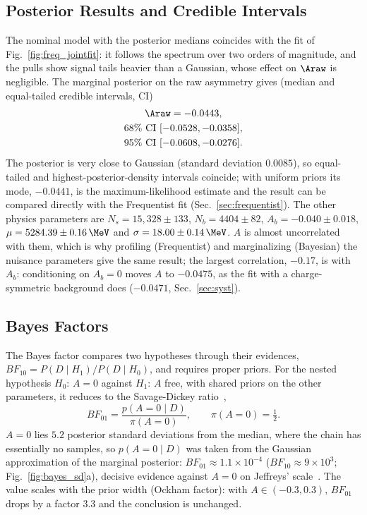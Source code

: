 \subsection{Posterior Results and Credible Intervals}
\label{sec:bayes_posterior}
The nominal model with the posterior medians coincides with the fit of Fig.~\ref{fig:freq_jointfit}: it follows the spectrum over two orders of magnitude, and the pulls show signal tails heavier than a Gaussian, whose effect on $\Araw$ is negligible. The marginal posterior on the raw asymmetry gives (median and equal-tailed credible intervals, CI)
\begin{gather*}
\Araw = -0.0443, \\
68\%~\text{CI}~[-0.0528,-0.0358], \\ 95\%~\text{CI}~[-0.0608,-0.0276].
\end{gather*}
The posterior is very close to Gaussian (standard deviation $0.0085$), so equal-tailed and highest-posterior-density intervals coincide; with uniform priors its mode, $-0.0441$, is the maximum-likelihood estimate and the result can be compared directly with the Frequentist fit (Sec.~\ref{sec:frequentist}). The other physics parameters are $N_s=15{,}328\pm133$, $N_b=4404\pm82$, $A_b=-0.040\pm0.018$, $\mu=5284.39\pm0.16\,\MeV$ and $\sigma=18.00\pm0.14\,\MeV$. $A$ is almost uncorrelated with them, which is why profiling (Frequentist) and marginalizing (Bayesian) the nuisance parameters give the same result; the largest correlation, $-0.17$, is with $A_b$: conditioning on $A_b=0$ moves $A$ to $-0.0475$, as the fit with a charge-symmetric background does ($-0.0471$, Sec.~\ref{sec:syst}).




\subsection{Bayes Factors}
\label{sec:bayes_factor}
The Bayes factor compares two hypotheses through their evidences, $BF_{10}=P(D\mid H_1)/P(D\mid H_0)$, and requires proper priors. For the nested hypothesis $H_0$: $A=0$ against $H_1$: $A$ free, with shared priors on the other parameters, it reduces to the Savage-Dickey ratio~\cite{dickey1971},
\[
BF_{01} = \frac{p(A=0\mid D)}{\pi(A=0)}, \qquad \pi(A=0)=\tfrac12 .
\]
$A=0$ lies $5.2$ posterior standard deviations from the median, where the chain has essentially no samples, so $p(A=0\mid D)$ was taken from the Gaussian approximation of the marginal posterior: $BF_{01}\approx1.1\times10^{-4}$ ($BF_{10}\approx9\times10^{3}$; Fig.~\ref{fig:bayes_sd}a), decisive evidence against $A=0$ on Jeffreys' scale~\cite{jeffreys}. The value scales with the prior width (Ockham factor): with $A\in(-0.3,0.3)$, $BF_{01}$ drops by a factor $3.3$ and the conclusion is unchanged.

